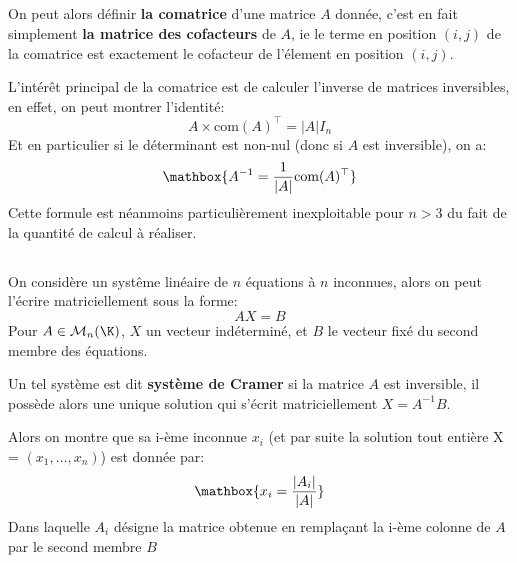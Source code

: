 \subsection*{}

On peut alors définir \textbf{la comatrice} d'une matrice \(A\) donnée, c'est en fait simplement \textbf{la matrice des cofacteurs} de \(A\), ie le terme en position \((i, j)\) de la comatrice est exactement le cofacteur de l'élement en position \((i, j)\). \<

L'intérêt principal de la comatrice est de calculer l'inverse de matrices inversibles, en effet, on peut montrer l'identité:
\[
   A \times \text{com}(A)^{\top} = |A|I_n   
\]
Et en particulier si le déterminant est non-nul (donc si \(A\) est inversible), on a:
\[
   \mathbox{A^{-1} = \frac{1}{|A|}\text{com}(A)^{\top}}   
\]
Cette formule est néanmoins particulièrement inexploitable pour \(n > 3\) du fait de la quantité de calcul à réaliser.

\subsection*{}

On considère un systême linéaire de \(n\) équations à \(n\) inconnues, alors on peut l'écrire matriciellement sous la forme:
\[
   AX = B   
\]
Pour \(A \in \mathcal{M}_n(\K)\), \(X\) un vecteur indéterminé, et \(B\) le vecteur fixé du second membre des équations.\<

Un tel système est dit \textbf{système de Cramer} si la matrice \(A\) est inversible, il possède alors une unique solution qui s'écrit matriciellement \(X = A^{-1}B\). \<

Alors on montre que sa i-ème inconnue \(x_i\) (et par suite la solution tout entière X = \((x_1, \ldots, x_n)\)) est donnée par:
\[
   \mathbox{x_i = \frac{|A_i|}{|A|}}   
\]
Dans laquelle \(A_i\) désigne la matrice obtenue en remplaçant la i-ème colonne de \(A\) par le second membre \(B\)\<

